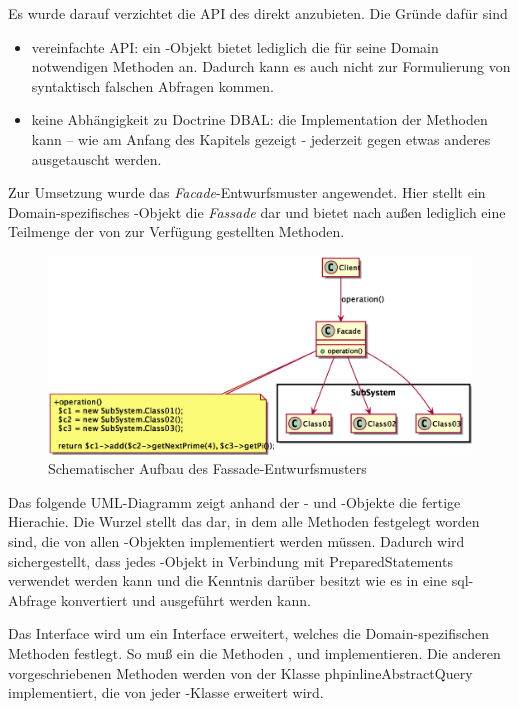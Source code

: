 Es wurde darauf verzichtet die API des  direkt anzubieten. Die Gründe dafür sind

\begin{itemize}
\item vereinfachte API: ein -Objekt bietet lediglich die für seine Domain notwendigen Methoden an. Dadurch kann es auch nicht zur Formulierung von syntaktisch falschen Abfragen kommen.
\item keine Abhängigkeit zu Doctrine DBAL: die Implementation der Methoden kann – wie am Anfang des Kapitels gezeigt - jederzeit gegen etwas anderes ausgetauscht werden.
\end{itemize}

Zur Umsetzung wurde das \textit{Facade}-Entwurfsmuster angewendet. Hier stellt ein Domain-spezifisches -Objekt die \textit{Fassade} dar und bietet nach außen lediglich eine Teilmenge der von  zur Verfügung gestellten Methoden.

\begin{figure}[H]
    \includegraphics[scale=0.5]{gfx/uml/FacadePattern.eps}
    \caption{Schematischer Aufbau des Fassade-Entwurfsmusters}
    \label{fig:facadePattern}
\end{figure}

Das folgende UML-Diagramm zeigt anhand der - und -Objekte die fertige Hierachie. Die Wurzel stellt das  dar, in dem alle Methoden festgelegt worden sind, die von allen -Objekten implementiert werden müssen. Dadurch wird sichergestellt, dass jedes -Objekt in Verbindung mit PreparedStatements verwendet werden kann und die Kenntnis darüber besitzt wie es in eine \gls{sql}-Abfrage konvertiert und ausgeführt werden kann.

Das Interface wird um ein Interface erweitert, welches die Domain-spezifischen Methoden festlegt. So muß ein  die Methoden ,  und  implementieren. Die anderen vorgeschriebenen Methoden werden von der Klasse phpinline{AbstractQuery} implementiert, die von jeder -Klasse erweitert wird.

